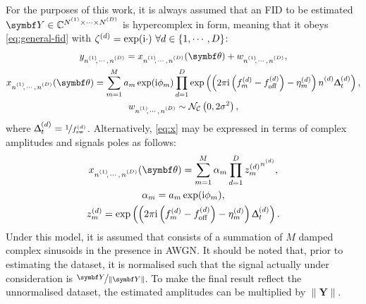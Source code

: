 For the purposes of this work, it is always assumed that an \ac{FID} to be
estimated
$\bY \in \mathbb{C}^{\None \times \cdots \times \ND}$
is hypercomplex in form, meaning that it obeys
\cref{eq:general-fid} with $\zeta^{(d)} = \exp(\mathrm{i} \cdot)\ \forall d \in
\lbrace 1, \cdots, D \rbrace$:
\begin{subequations}
    \begin{gather}
        \ynonenD = \xnonenD(\bth) + \wnonenD,\\
        \xnonenD(\bth) =
        \sumM \amexpphim
        \prodD \exp\left(\left(
            2 \pi \iu \left(f^{(d)}_m - \foffd\right)
            -\eta_m^{(d)}\right)
            \nd \Dtd\right),\label{eq:x}\\
        \wnonenD \sim \mathcal{N_C}\left(0, 2\sigma^2\right),%
    \end{gather}%
    \label{eq:hypercomplex-fid}%
\end{subequations}%
where $\Updelta_t^{(d)} = \nicefrac{1}{f_{\mathrm{sw}}^{(d)}}$.
Alternatively, \cref{eq:x} may be expressed in terms of complex amplitudes and
signals poles as follows:
\begin{subequations}%
    \begin{gather}%
        \xnonenD(\bth) = \sumM \alpha_m \prodD {z^{(d)}_m}^{\nd},\\
        \alpha_m = \amexpphim,\\
        z_m^{(d)} = \exp\left(
            \left(2 \pi \iu \left(f_m^{(d)} - \foffd\right) - \eta^{(d)}_m\right) \Dtd
        \right).%
    \end{gather}%
    \label{eq:x-alpha-z}%
\end{subequations}%
Under this model, it is assumed that
 consists of a summation of $M$ damped complex sinusoids in the
presence in \ac{AWGN}.
It should be noted that, prior to estimating the dataset, it is normalised
such that the signal actually under consideration is $\nicefrac{\bY}{\lVert \bY
\rVert}$.
To make the final result reflect the unnormalised dataset, the estimated
amplitudes can be multiplied by $\lVert \symbf{Y} \rVert$.

